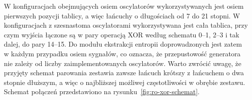 W konfiguracjach obejmujących osiem oscylatorów wykorzystywanych jest osiem pierwszych
pozycji tablicy, a więc łańcuchy o długościach od 7 do 21 stopni. W konfiguracjach
z szesnastoma oscylatorami wykorzystywana jest cała tablica, przy czym wyjścia łączone są
w pary operacją XOR według schematu 0--1, 2--3 i tak dalej, do pary 14--15. Do modułu
ekstrakcji entropii doprowadzonych jest zatem w każdym przypadku osiem sygnałów,
co oznacza, że przepustowość generatora nie zależy od liczby zaimplementowanych
oscylatorów. Warto zwrócić uwagę, że przyjęty schemat parowania zestawia zawsze łańcuch
krótszy z łańcuchem o dwa stopnie dłuższym, a więc o najbliższej możliwej częstotliwości
w obrębie zestawu. Schemat połączeń przedstawiono na rysunku~\ref{fig:ro-xor-schemat}.

\begin{figure}[htbp]
    \centering
\end{figure}
